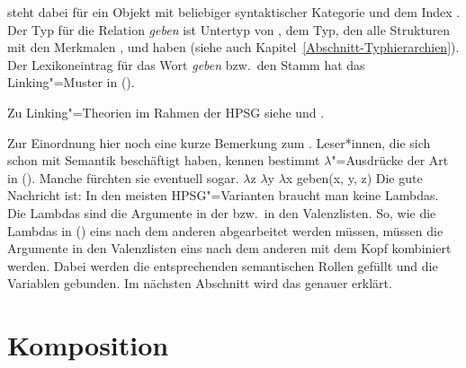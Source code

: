 \z
[] steht dabei für ein Objekt mit beliebiger syntaktischer Kategorie und dem Index
. 
Der Typ für die Relation \emph{geben} ist Untertyp von , dem Typ, den alle
Strukturen mit den Merkmalen \argone, \argtwo und \argthree haben (siehe auch Kapitel~\ref{Abschnitt-Typhierarchien}). 
Der Lexikoneintrag für das Wort \emph{geben} bzw.\ den Stamm  hat das Linking"=Muster in
(). 



Zu Linking"=Theorien im Rahmen der HPSG siehe  und .

Zur Einordnung hier noch eine kurze Bemerkung zum . Leser*innen, die sich schon mit
Semantik beschäftigt haben, kennen bestimmt $\lambda$"=Ausdrücke der Art in (). Manche
fürchten sie eventuell sogar.
\ea
$\lambda$z $\lambda$y $\lambda$x geben(x, y, z)
\z
Die gute Nachricht ist: In den meisten HPSG"=Varianten braucht man keine Lambdas. Die Lambdas sind
die Argumente in der \argstl bzw.\ in den Valenzlisten. So, wie die Lambdas in () eins nach
dem anderen abgearbeitet werden müssen, müssen die Argumente in den Valenzlisten eins nach dem
anderen mit dem Kopf kombiniert werden. Dabei werden die entsprechenden semantischen Rollen gefüllt
und die Variablen gebunden. Im nächsten Abschnitt wird das genauer erklärt.

\section{Komposition}
\label{Abschnitt-Komposition}\label{Semantik-Adjektivmodifikation}

